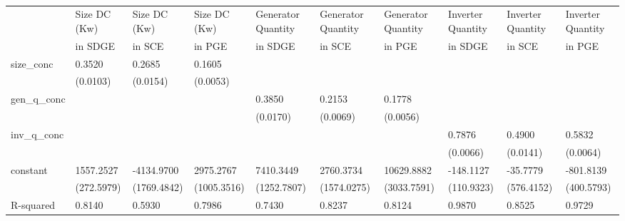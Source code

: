 \begin{table}
\caption{}
\label{}
\begin{center}
\begin{tabular}{llllllllll}
\hline
               & Size DC (Kw)  & Size DC (Kw)  & Size DC (Kw)  & Generator Quantity  & Generator Quantity  & Generator Quantity  & Inverter Quantity  & Inverter Quantity  & Inverter Quantity   \\
               &  in SDGE      &  in SCE       &  in PGE       &  in SDGE            &  in SCE             &  in PGE             &  in SDGE           &  in SCE            &  in PGE             \\
\hline
size\_conc     & 0.3520        & 0.2685        & 0.1605        &                     &                     &                     &                    &                    &                     \\
               & (0.0103)      & (0.0154)      & (0.0053)      &                     &                     &                     &                    &                    &                     \\
gen\_q\_conc   &               &               &               & 0.3850              & 0.2153              & 0.1778              &                    &                    &                     \\
               &               &               &               & (0.0170)            & (0.0069)            & (0.0056)            &                    &                    &                     \\
inv\_q\_conc   &               &               &               &                     &                     &                     & 0.7876             & 0.4900             & 0.5832              \\
               &               &               &               &                     &                     &                     & (0.0066)           & (0.0141)           & (0.0064)            \\
constant       & 1557.2527     & -4134.9700    & 2975.2767     & 7410.3449           & 2760.3734           & 10629.8882          & -148.1127          & -35.7779           & -801.8139           \\
               & (272.5979)    & (1769.4842)   & (1005.3516)   & (1252.7807)         & (1574.0275)         & (3033.7591)         & (110.9323)         & (576.4152)         & (400.5793)          \\
R-squared      & 0.8140        & 0.5930        & 0.7986        & 0.7430              & 0.8237              & 0.8124              & 0.9870             & 0.8525             & 0.9729              \\

\end{tabular}
\end{center}
\end{table}
